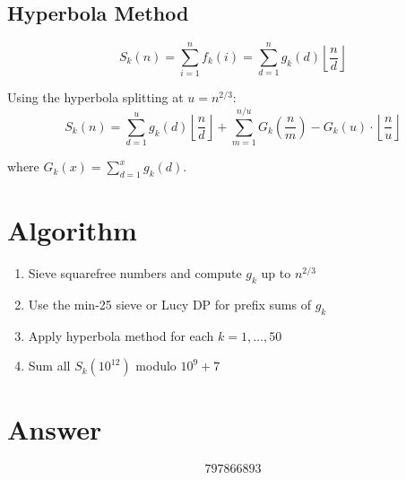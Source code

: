 \documentclass[12pt]{article}
\theoremstyle{definition}
\begin{document}
\subsection{Hyperbola Method}

\[
S_k(n) = \sum_{i=1}^n f_k(i) = \sum_{d=1}^n g_k(d) \left\lfloor \frac{n}{d} \right\rfloor
\]

Using the hyperbola splitting at $u = n^{2/3}$:
\[
S_k(n) = \sum_{d=1}^u g_k(d) \left\lfloor \frac{n}{d} \right\rfloor + \sum_{m=1}^{n/u} G_k\left(\frac{n}{m}\right) - G_k(u) \cdot \left\lfloor \frac{n}{u} \right\rfloor
\]

where $G_k(x) = \sum_{d=1}^x g_k(d)$.

\section{Algorithm}

\begin{enumerate}
\item Sieve squarefree numbers and compute $g_k$ up to $n^{2/3}$
\item Use the min-25 sieve or Lucy DP for prefix sums of $g_k$
\item Apply hyperbola method for each $k = 1, \ldots, 50$
\item Sum all $S_k(10^{12})$ modulo $10^9 + 7$
\end{enumerate}

\section{Answer}

\[
\boxed{797866893}
\]
\end{document}
